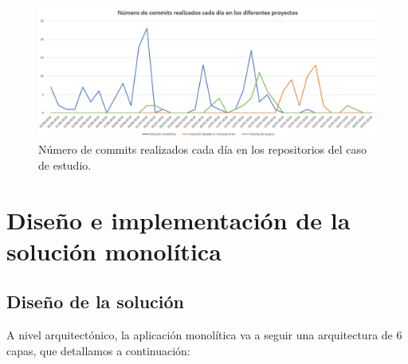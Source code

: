 \documentclass[11pt,spanish,listoffigures]{tfgetsinf}
\begin{document}
\begin{figure}[h]
\centering
\includegraphics[scale=0.5]{commits}
\caption{Número de commits realizados cada día en los repositorios del caso de estudio.}
\end{figure}

%

\chapter{Diseño e implementación de la solución monolítica}

\section{Diseño de la solución} \label{sct:DiseñoMonolitico}

A nivel arquitectónico, la aplicación monolítica va a seguir una arquitectura de 6 capas, que detallamos a continuación:
\end{document}
